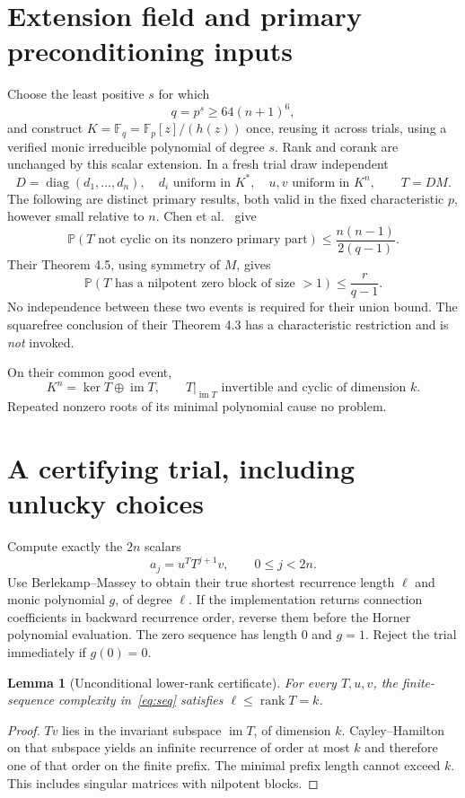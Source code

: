 \documentclass[11pt]{article}
\newtheorem{lemma}[theorem]{Lemma}
\newcommand{\F}{\mathbb F}
\newcommand{\rank}{\operatorname{rank}}
\newcommand{\Prob}{\mathbb P}
\begin{document}
\section{Extension field and primary preconditioning inputs}
Choose the least positive $s$ for which
\[
 q=p^s\ge64(n+1)^6,
\]
and construct $K=\F_q=\F_p[z]/(h(z))$ once, reusing it across trials,
using a verified monic irreducible polynomial of degree $s$.
Rank and corank are unchanged
by this scalar extension.
In a fresh trial draw independent
\[
 D=\operatorname{diag}(d_1,\ldots,d_n),\quad d_i\text{ uniform in }K^*,
 \quad u,v\text{ uniform in }K^n,\qquad T=DM.
\]
The following are distinct primary results, both valid in the fixed
characteristic $p$, however small relative to $n$.
Chen et al.\ \cite[Theorem 4.2]{chen} give
\begin{equation}\label{eq:cyc}
 \Prob(T\text{ not cyclic on its nonzero primary part})
 \le\frac{n(n-1)}{2(q-1)}.
\end{equation}
Their Theorem 4.5, using symmetry of $M$, gives
\begin{equation}\label{eq:nil}
 \Prob(T\text{ has a nilpotent zero block of size }>1)
 \le\frac r{q-1}.
\end{equation}
No independence between these two events is required for their union
bound. The squarefree conclusion of their Theorem 4.3 has a
characteristic restriction and is \emph{not} invoked.

On their common good event,
\[
 K^n=\ker T\oplus\operatorname{im}T,
 \qquad T|_{\operatorname{im}T}\text{ invertible and cyclic of dimension }k.
\]
Repeated nonzero roots of its minimal polynomial cause no problem.

\section{A certifying trial, including unlucky choices}
Compute exactly the $2n$ scalars
\begin{equation}\label{eq:seq}
 a_j=u^TT^{j+1}v,\qquad 0\le j<2n.
\end{equation}
Use Berlekamp--Massey to obtain their true shortest recurrence length
$\ell$ and monic polynomial $g$, of degree $\ell$.
If the implementation returns connection coefficients in backward
recurrence order, reverse them before the Horner polynomial evaluation.
The zero sequence has length $0$ and $g=1$.
Reject the trial immediately if $g(0)=0$.

\begin{lemma}[Unconditional lower-rank certificate]\label{lem:lower}
For every $T,u,v$, the finite-sequence complexity in~\eqref{eq:seq}
satisfies $\ell\le\rank T=k$.
\end{lemma}
\begin{proof}
$Tv$ lies in the invariant subspace $\operatorname{im}T$, of
dimension $k$. Cayley--Hamilton on that subspace yields an infinite
recurrence of order at most $k$ and therefore one of that order on
the finite prefix. The minimal prefix length cannot exceed $k$.
This includes singular matrices with nilpotent blocks.
\end{proof}
\end{document}
